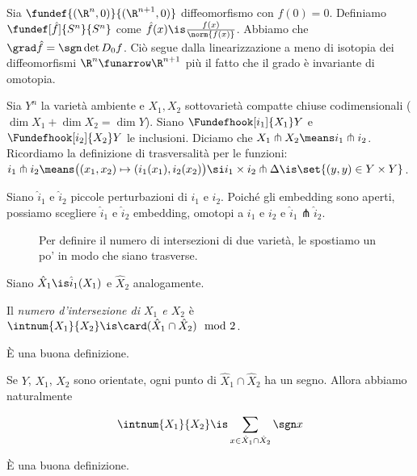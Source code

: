 
Sia $\fundef{(\R^n,0)}{(\R^{n+1},0)}$ diffeomorfismo con $f(0)=0$.
Definiamo $\fundef[\hat f]{S^n}{S^n}$ come $\hat f(x)\is\frac{f(x)}{\norm{f(x)}}$.
Abbiamo che $\grad\hat f=\sgn\det D_0f$.
Ciò segue dalla linearizzazione a meno di isotopia dei diffeomorfismi $\R^n\funarrow\R^{n+1}$ più il fatto che il grado è invariante di omotopia.


Sia $Y^n$ la varietà ambiente e $X_1,X_2$ sottovarietà compatte chiuse codimensionali ($\dim X_1+\dim X_2=\dim Y$).
Siano $\Fundefhook[i_1]{X_1}Y$ e $\Fundefhook[i_2]{X_2}Y$ le inclusioni.
Diciamo che $X_1 \pitchfork X_2\means i_1\pitchfork i_2$.
Ricordiamo la definizione di trasversalità per le funzioni: $i_1 \pitchfork i_2 \means\big((x_1,x_2)\mapsto(i_1(x_1),i_2(x_2)\big)\si i_1\times i_2\pitchfork\Delta\is\set{(y,y)\in Y\times Y}$.

Siano $\hat i_1$ e $\hat i_2$ piccole perturbazioni di $i_1$ e $i_2$.
Poiché gli embedding sono aperti, possiamo scegliere $\hat i_1$ e $\hat i_2$ embedding, omotopi a $i_1$ e $i_2$ e $\hat i_1\pitchfork\hat i_2$.
\begin{figure}
	\centering
	
	\caption{Per definire il numero di intersezioni di due varietà, le spostiamo un po' in modo che siano trasverse.}
\end{figure}
Siano $\hat X_1\is\hat i_1(X_1)$ e $\hat X_2$ analogamente.

\begin{defn}
	Il \emph{numero d'intersezione di $X_1$ e $X_2$} è $\intnum{X_1}{X_2}\is\card(\hat X_1\cap\hat X_2)\mod 2$.
\end{defn}

\begin{teo}
	È una buona definizione.
\end{teo}


Se $Y$, $X_1$, $X_2$ sono orientate, ogni punto di $\hat X_1\cap\hat X_2$ ha un segno.
Allora abbiamo naturalmente

\begin{defn}
	\[\intnum{X_1}{X_2}\is\sum_{x\in\hat X_1\cap\hat X_2}\sgn x\]
\end{defn}

\begin{teo}
	È una buona definizione.
\end{teo}

